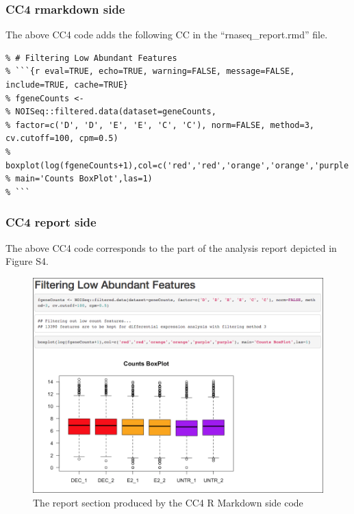 \documentclass[]{article}
\begin{document}
\hypertarget{cc4-rmarkdown-side}{%
\subsubsection{CC4 rmarkdown side}\label{cc4-rmarkdown-side}}

The above CC4 code adds the following CC in the ``rnaseq\_report.rmd''
file.

\begin{verbatim}
% # Filtering Low Abundant Features
% ```{r eval=TRUE, echo=TRUE, warning=FALSE, message=FALSE, include=TRUE, cache=TRUE}
% fgeneCounts <- 
% NOISeq::filtered.data(dataset=geneCounts, 
% factor=c('D', 'D', 'E', 'E', 'C', 'C'), norm=FALSE, method=3, cv.cutoff=100, cpm=0.5)
% boxplot(log(fgeneCounts+1),col=c('red','red','orange','orange','purple','purple'), 
% main='Counts BoxPlot',las=1)
% ```
\end{verbatim}

\hypertarget{cc4-report-side}{%
\subsubsection{CC4 report side}\label{cc4-report-side}}

The above CC4 code corresponds to the part of the analysis report
depicted in Figure S4.

\begin{figure}[ht]

{\centering \includegraphics[width=0.9\linewidth]{imgs/4} 

}

\caption{The report section produced by the CC4 R Markdown side code}\label{fig:unnamed-chunk-10}
\end{figure}
\end{document}
